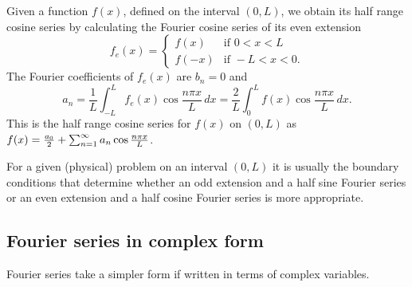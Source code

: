 \documentclass[10pt, a4paper]{article}
\begin{document}
Given a function $f(x)$,
defined on the interval $(0, L)$,
we obtain its half range cosine series by calculating the Fourier cosine series of its even extension
\[
f_e(x) = \begin{cases}
    f(x) & \text{if } 0 < x < L \\
    f(-x) & \text{if } -L < x < 0.
\end{cases}
\]
The Fourier coefficients of $f_e(x)$ are $b_n = 0$ and
\[
a_n = \frac{1}{L}\int_{-L}^{L}f_e(x)\cos{\frac{n\pi x}{L}}\,dx = \frac{2}{L}\int_{0}^{L}f(x)\cos{\frac{n\pi x}{L}}\,dx.
\]
This is the half range cosine series for $f(x)$ on $(0, L)$ as $f(x) = \frac{a_0}{2} + \infsum[n = 1]a_n\cos{\frac{n\pi x}{L}}$.

For a given
(physical)
problem on an interval $(0, L)$ it is usually the boundary conditions that determine whether an odd extension and a half sine Fourier series or an even extension and a half cosine Fourier series is more appropriate.

\subsection{Fourier series in complex form}
Fourier series take a simpler form if written in terms of complex variables.
\end{document}
